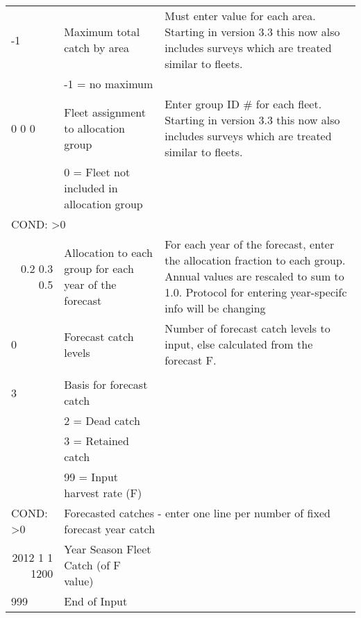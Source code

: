 \begin{landscape}
\begin{longtable}{p{3cm} p{7cm} p{11cm}}
  \hline
  -1 & Maximum total catch by area & \multirow{1}{1cm}[-0.1cm]{\parbox{11cm}{Must enter value for each area. Starting in version 3.3 this now also includes surveys which are treated similar to fleets.}} \\
     & -1 = no maximum & \\
     
  \hline
  0 0 0 & Fleet assignment to allocation group & \multirow{1}{1cm}[-0.1cm]{\parbox{11cm}{Enter group ID \# for each fleet. Starting in version 3.3 this now also includes surveys which are treated similar to fleets.}} \\
    & 0 = Fleet not included in allocation group & \\
    
  \hline
  \multicolumn{3}{l}{COND: >0 } \\
  \multicolumn{1}{r}{0.2 0.3 0.5}  & Allocation to each group for each year of the forecast & For each year of the forecast, enter the allocation fraction to each group.  Annual values are rescaled to sum to 1.0.  Protocol for entering year-specifc info will be changing \\
  
  \hline
  0 & Forecast catch levels & \multirow{1}{1cm}[-0.1cm]{\parbox{11cm}{Number of forecast catch levels to input, else calculated from the forecast F.}} \\
  \\
  
  
  \hline
  3 & Basis for forecast catch & \\
    & 2 = Dead catch & \\
    & 3 = Retained catch & \\
    & 99 = Input harvest rate (F) & \\
    
  \hline
  \multicolumn{1}{l}{COND: >0 }& \multicolumn{2}{l}{Forecasted catches - enter one line per number of fixed forecast year catch }\\
  \multicolumn{1}{r}{2012 1 1 1200}  & Year Season Fleet Catch (of F value)  &  \\
  
  \hline
  999 & End of Input & \\

 
 
  \end{longtable}
\end{landscape}